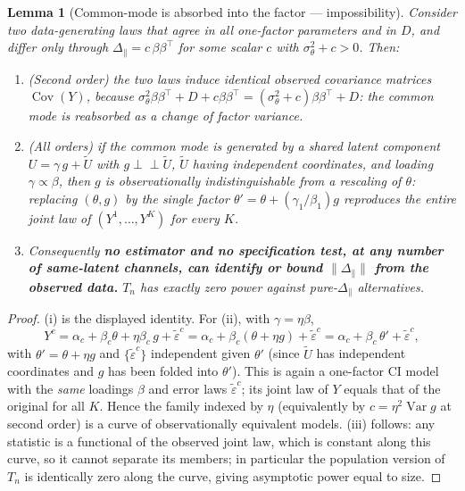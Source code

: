\documentclass[11pt]{article}
\newtheorem{lemma}{Lemma}
\theoremstyle{definition}
\newcommand{\Var}{\operatorname{Var}}
\newcommand{\Cov}{\operatorname{Cov}}
\newcommand{\ind}{\perp\!\!\!\perp}
\newcommand{\Th}{\theta}
\newcommand{\lat}{\Th}
\newcommand{\Dpar}{\Delta_{\parallel}}
\begin{document}
\begin{lemma}[Common-mode is absorbed into the factor --- impossibility]
\label{thm:impossible}
Consider two data-generating laws that agree in all one-factor parameters and
in $D$, and differ only through $\Dpar=c\,\beta\beta^\top$ for some scalar $c$
with $\sigma_\lat^2+c>0$. Then:
\begin{enumerate}[label=(\roman*),leftmargin=2.2em]
\item \emph{(Second order)} the two laws induce \emph{identical} observed
covariance matrices $\Cov(Y)$, because
$\sigma_\lat^2\beta\beta^\top+D+c\beta\beta^\top
=(\sigma_\lat^2+c)\beta\beta^\top+D$: the common mode is reabsorbed as a
change of factor variance.
\item \emph{(All orders)} if the common mode is generated by a shared latent
component $U=\gamma\,g+\tilde U$ with $g\ind\tilde U$, $\tilde U$ having
independent coordinates, and loading $\gamma\propto\beta$, then $g$ is
observationally indistinguishable from a rescaling of $\lat$: replacing
$(\lat,g)$ by the single factor $\lat'=\lat+(\gamma_1/\beta_1)g$ reproduces the
\emph{entire joint law} of $(Y^1,\dots,Y^K)$ for \emph{every} $K$.
\item Consequently \textbf{no estimator and no specification test, at any number
of same-latent channels, can identify or bound $\|\Dpar\|$ from the observed
data.} $T_n$ has exactly zero power against pure-$\Dpar$ alternatives.
\end{enumerate}
\end{lemma}

\begin{proof}
(i) is the displayed identity. For (ii), with $\gamma=\eta\beta$,
\[
 Y^c=\alpha_c+\beta_c\lat+\eta\beta_c\,g+\tilde\varepsilon^c
    =\alpha_c+\beta_c(\lat+\eta g)+\tilde\varepsilon^c
    =\alpha_c+\beta_c\,\lat'+\tilde\varepsilon^c,
\]
with $\lat'=\lat+\eta g$ and $\{\tilde\varepsilon^c\}$ independent given
$\lat'$ (since $\tilde U$ has independent coordinates and $g$ has been folded
into $\lat'$). This is again a one-factor CI model with the \emph{same} loadings
$\beta$ and error laws $\tilde\varepsilon^c$; its joint law of $Y$ equals that
of the original for all $K$. Hence the family indexed by $\eta$ (equivalently by
$c=\eta^2\Var g$ at second order) is a curve of observationally equivalent
models. (iii) follows: any statistic is a functional of the observed joint law,
which is constant along this curve, so it cannot separate its members; in
particular the population version of $T_n$ is identically zero along the curve,
giving asymptotic power equal to size.
\end{proof}
\end{document}
